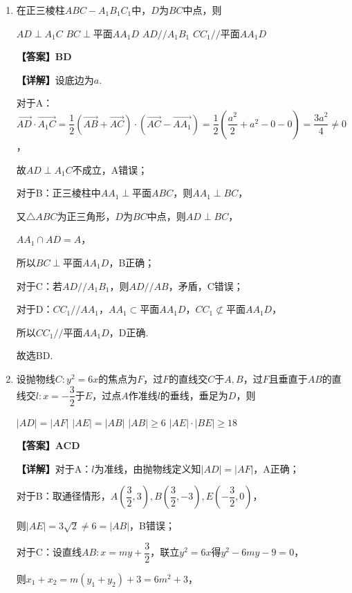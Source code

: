\documentclass[12pt,a4paper]{article}
\providecommand{\varparallel}{\mathrel{/\!/}}
\begin{document}
	\begin{enumerate}[leftmargin=*,label=\arabic*.,resume,itemsep=0.8ex]
		\item 在正三棱柱$ABC-A_1B_1C_1$中，$D$为$BC$中点，则
		\begin{choicesFour}
			\choice $AD\perp A_1C$ \choice $BC\perp$平面$AA_1D$ \choice $AD\varparallel A_1B_1$ \choice $CC_1\varparallel$平面$AA_1D$
		\end{choicesFour}
		\textbf{【答案】BD}
		
		\textbf{【详解】}设底边为$a$.
		
		对于A：$\overrightarrow{AD}\cdot\overrightarrow{A_1C}=\dfrac12(\overrightarrow{AB}+\overrightarrow{AC})\cdot(\overrightarrow{AC}-\overrightarrow{AA_1})=\dfrac12\left(\dfrac{a^2}{2}+a^2-0-0\right)=\dfrac{3a^2}{4}\ne0$，
		
		故$AD\perp A_1C$不成立，A错误；
		
		对于B：正三棱柱中$AA_1\perp$平面$ABC$，则$AA_1\perp BC$，
		
		又$\triangle ABC$为正三角形，$D$为$BC$中点，则$AD\perp BC$，
		
		$AA_1\cap AD=A$，
		
		所以$BC\perp$平面$AA_1D$，B正确；
		
		对于C：若$AD\varparallel A_1B_1$，则$AD\varparallel AB$，矛盾，C错误；
		
		对于D：$CC_1\varparallel AA_1$，$AA_1\subset$平面$AA_1D$，$CC_1\not\subset$平面$AA_1D$，
		
		所以$CC_1\varparallel$平面$AA_1D$，D正确.
		
		故选BD.
		
		\item 设抛物线$C:y^2=6x$的焦点为$F$，过$F$的直线交$C$于$A,B$，过$F$且垂直于$AB$的直线交$l:x=-\dfrac32$于$E$，过点$A$作准线$l$的垂线，垂足为$D$，则
		\begin{choicesTwo}
			\choice $|AD|=|AF|$
			\choice $|AE|=|AB|$
			\choice $|AB|\ge6$
			\choice $|AE|\cdot|BE|\ge18$
		\end{choicesTwo}
		\textbf{【答案】ACD}
		
		\textbf{【详解】}对于A：$l$为准线，由抛物线定义知$|AD|=|AF|$，A正确；
		
		对于B：取通径情形，$A\left(\dfrac32,3\right),B\left(\dfrac32,-3\right),E\left(-\dfrac32,0\right)$，
		
		则$|AE|=3\sqrt2\ne6=|AB|$，B错误；
		
		对于C：设直线$AB:x=my+\dfrac32$，联立$y^2=6x$得$y^2-6my-9=0$，
		
		则$x_1+x_2=m(y_1+y_2)+3=6m^2+3$，
		

\end{enumerate}
\end{document}
